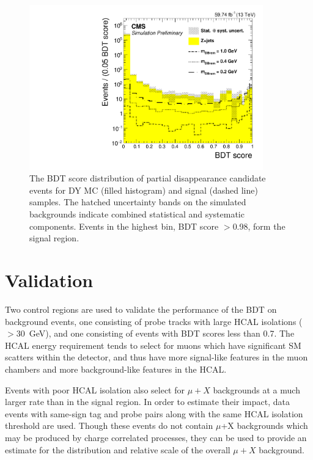 \begin{figure}[htbp]
	\centering
	\includegraphics[width=0.9\textwidth]{figures/BDTscore_DYandSignal.pdf}
	\caption[Partial Disappearance BDT Output for DY and Signal]{The BDT score distribution of partial disappearance candidate events for DY MC (filled histogram) and signal (dashed line) samples. The hatched uncertainty bands on the simulated backgrounds indicate combined statistical and systematic components. Events in the highest bin, BDT score $>$0.98, form the signal region.}
        \label{fig:BDToutput}
\end{figure}

\section{Validation}
\label{sec:BDTvalid}
Two control regions are used to validate the performance of the BDT on background events, one consisting of probe tracks with large HCAL isolations ($>$\SI{30}{\giga\eV}), and one consisting of events with BDT scores less than 0.7. 
The HCAL energy requirement tends to select for muons which have significant SM scatters within the detector, and thus have more signal-like features in the muon chambers and more background-like features in the HCAL.

Events with poor HCAL isolation also select for $\mu+X$ backgrounds at a much larger rate than in the signal region.
In order to estimate their impact, data events with same-sign tag and probe pairs along with the same HCAL isolation threshold are used.
Though these events do not contain $\mu$+X backgrounds which may be produced by charge correlated processes, they can be used to provide an estimate for the distribution and relative scale of the overall $\mu+X$ background.

